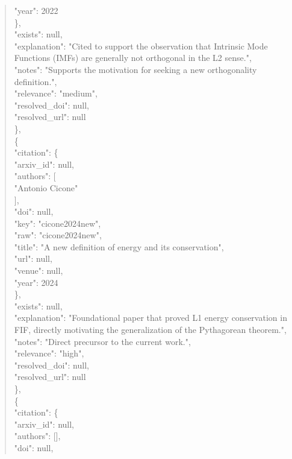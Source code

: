 \documentclass[11pt]{article}
\begin{document}
\begin{quote}
        "year": 2022\\
      \},\\
      "exists": null,\\
      "explanation": "Cited to support the observation that Intrinsic Mode Functions (IMFs) are generally not orthogonal in the L2 sense.",\\
      "notes": "Supports the motivation for seeking a new orthogonality definition.",\\
      "relevance": "medium",\\
      "resolved\_doi": null,\\
      "resolved\_url": null\\
    \},\\
    \{\\
      "citation": \{\\
        "arxiv\_id": null,\\
        "authors": [\\
          "Antonio Cicone"\\
        ],\\
        "doi": null,\\
        "key": "cicone2024new",\\
        "raw": "cicone2024new",\\
        "title": "A new definition of energy and its conservation",\\
        "url": null,\\
        "venue": null,\\
        "year": 2024\\
      \},\\
      "exists": null,\\
      "explanation": "Foundational paper that proved L1 energy conservation in FIF, directly motivating the generalization of the Pythagorean theorem.",\\
      "notes": "Direct precursor to the current work.",\\
      "relevance": "high",\\
      "resolved\_doi": null,\\
      "resolved\_url": null\\
    \},\\
    \{\\
      "citation": \{\\
        "arxiv\_id": null,\\
        "authors": [],\\
        "doi": null,\\

\end{quote}
\end{document}
